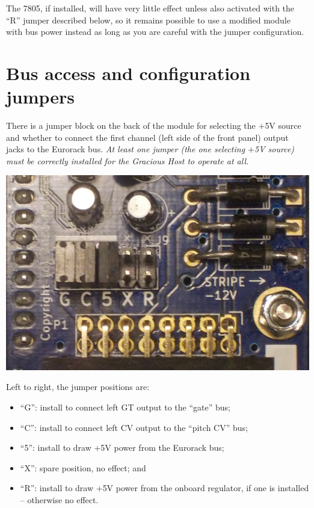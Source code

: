 The 7805, if installed, will have very little effect unless also activated
with the ``R'' jumper described below, so it remains possible to use a
modified module with bus power instead as long as you are careful with the
jumper configuration.

\section{Bus access and configuration jumpers}

There is a jumper block on the back of the module for selecting the $+$5V
source and whether to connect the first channel (left side of the front
panel) output jacks to the Eurorack bus.
\emph{At least one jumper (the one selecting $+$5V source) must be correctly
installed for the Gracious Host to operate at all.}

\nopagebreak\noindent
{\hspace*{\fill}\includegraphics[width=\linewidth]{jumpers.jpg}\hspace*{\fill}\par} 

Left to right, the jumper positions are:
\begin{itemize}
  \item ``G'':  install to connect left GT output to the ``gate'' bus;
  \item ``C'':  install to connect left CV output to the ``pitch CV'' bus;
  \item ``5'':  install to draw $+$5V power from the Eurorack bus;
  \item ``X'':  spare position, no effect; and
  \item ``R'':  install to draw $+$5V power from the onboard regulator, if
    one is installed -- otherwise no effect.
\end{itemize}

